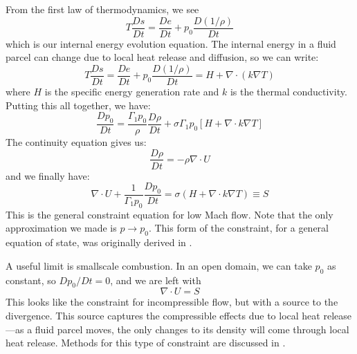 From the first law of thermodynamics, we see
\begin{equation}
T \frac{Ds}{Dt} = \frac{De}{Dt} + p_0 \frac{D(1/\rho)}{Dt}
\end{equation}
which is our internal energy evolution equation.  The internal
energy in a fluid parcel can change due to local heat release and 
diffusion, so we can write:
\begin{equation}
T \frac{Ds}{Dt} = \frac{De}{Dt} + p_0 \frac{D(1/\rho)}{Dt} = H + \nabla \cdot (k \nabla T)
\end{equation}
where $H$ is the specific energy generation rate and $k$ is the 
thermal conductivity.  Putting this all together, we have:
\begin{equation}
\frac{Dp_0}{Dt} = \frac{\Gamma_1 p_0}{\rho} \frac{D\rho}{Dt}
   + \sigma \Gamma_1 p_0 \left [ H + \nabla \cdot k \nabla T \right ]
\end{equation}
The continuity equation gives us:
\begin{equation}
\frac{D\rho}{Dt} = -\rho \nabla \cdot U
\end{equation}
and we finally have:
\begin{equation}
\nabla \cdot U + \frac{1}{\Gamma_1 p_0}\frac{Dp_0}{Dt} = \sigma (H + \nabla \cdot k  \nabla T) \equiv S
\end{equation}
This is the general constraint equation for low Mach flow.  Note that the
only approximation we made is $p \rightarrow p_0$.  This form of the constraint,
for a general equation of state, was originally derived in \cite{ABRZ:I}.  

A useful limit is smallscale combustion.  In an open domain, we can take
$p_0$ as constant, so $Dp_0/Dt = 0$, and we are left with
\begin{equation}
\nabla \cdot U = S
\end{equation}
This looks like the constraint for incompressible flow, but with a source
to the divergence.  This source captures the compressible effects due
to local heat release---as a fluid parcel moves, the only changes to
its density will come through local heat release.  Methods for this
type of constraint are discussed in \cite{pember-flame,DayBell:2000,SNpaper}.

